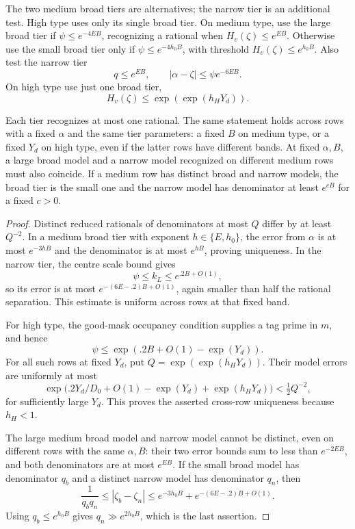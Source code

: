\begin{definition}
\label{pre:recognized-models}
The two medium broad tiers are alternatives; the narrow tier is an
additional test. High type uses only its single broad tier.
On medium type, use the large broad tier if
$\psi\le e^{-4EB}$, recognizing a rational when
$H_v(\zeta)\le e^{EB}$. Otherwise use the small broad tier only if
$\psi\le e^{-4h_0B}$, with threshold $H_v(\zeta)\le e^{h_0B}$.
Also test the narrow tier
\[
 q\le e^{EB},\qquad |\alpha-\zeta|\le\psi e^{-6EB}.
\]
On high type use just one broad tier,
\[
 H_v(\zeta)\le\exp(\exp(h_HY_d)).
\]
\end{definition}

\begin{lemma}
\label{pre:model-uniqueness}
Each tier recognizes at most one rational. The same statement
holds across rows with a fixed $\alpha$ and the same tier
parameters: a fixed $B$ on medium type, or a fixed $Y_d$ on high
type, even if the latter rows have different bands. At fixed
$\alpha,B$, a large broad model and a narrow model recognized
on different medium rows must also coincide. If a medium row has
distinct broad and narrow models,
the broad tier is the small one and the narrow model has
denominator at least $e^{cB}$ for a fixed $c>0$.
\end{lemma}

\begin{proof}
Distinct reduced rationals of denominators at most $Q$ differ by
at least $Q^{-2}$. In a medium broad tier with exponent
$h\in\{E,h_0\}$, the error from $\alpha$ is at most $e^{-3hB}$
and the denominator is at most $e^{hB}$, proving uniqueness.
In the narrow tier, the centre scale bound gives
\[
 \psi\le k_L\le e^{.2B+O(1)},
\]
so its error is at most $e^{-(6E-.2)B+O(1)}$, again smaller than
half the rational separation. This estimate is uniform across
rows at that fixed band.

For high type, the good-mask occupancy condition supplies a tag
prime in $m$, and hence
\[
 \psi\le\exp(.2B+O(1)-\exp(Y_d)).
\]
For all such rows at fixed $Y_d$, put
$Q=\exp(\exp(h_HY_d))$. Their model errors are uniformly at most
\[
 \exp\bigl(.2Y_d/D_0+O(1)-\exp(Y_d)+\exp(h_HY_d)\bigr)
 <\tfrac12 Q^{-2},
\]
for sufficiently large $Y_d$. This proves the asserted cross-row
uniqueness because $h_H<1$.

The large medium broad model and narrow model cannot be distinct,
even on different rows with the same $\alpha,B$: their two error
bounds sum to less than $e^{-2EB}$, and both denominators are at
most $e^{EB}$. If the small broad model has denominator $q_b$
and a distinct narrow model has denominator $q_n$, then
\[
 \frac1{q_bq_n}
 \le |\zeta_b-\zeta_n|
 \le e^{-3h_0B}+e^{-(6E-.2)B+O(1)}.
\]
Using $q_b\le e^{h_0B}$ gives $q_n\gg e^{2h_0B}$, which is
the last assertion.
\end{proof}

